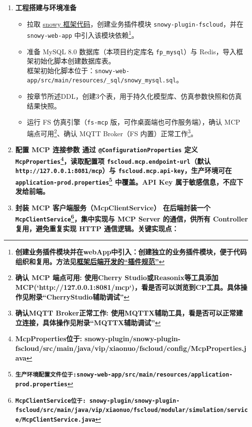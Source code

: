 \begin{enumerate}[label=\arabic*)]
	\item \bf{工程搭建与环境准备}\label{sec:brief-step1}
	\begin{itemize}
		\item 拉取 \href{https://gitee.com/xiaonuobase/snowy}{snowy 框架代码}，创建业务插件模块 \texttt{snowy-plugin-fscloud}，并在 \texttt{snowy-web-app} 中引入该模块依赖\footnote{\bf{创建业务插件模块并在webApp中引入}：创建独立的业务插件模块，便于代码组织和复用。方法见\href{https://xiaonuo.vip/doc?catalogueId=1574674577108783105&menuId=1574678028987420674&lineIndex=1}{框架后端开发的“插件规范”}}。
		\item 准备 MySQL 8.0 数据库（本项目约定库名 \texttt{fp\_mysql}）与 Redis，导入框架初始化脚本创建数据库表。\\框架初始化脚本位于：\texttt{snowy-web-app/src/main/resources/\_sql/snowy\_mysql.sql}。
        \item 按章节所述DDL，创建3个表，用于持久化模型库、仿真参数快照和仿真结果快照。
		\item 运行 FS 仿真引擎（\texttt{fs-mcp} 版，可作桌面端也可作服务端），确认 MCP 端点可用\footnote{\bf{确认 MCP 端点可用}: 使用Cherry Studio或Reasonix等工具添加MCP(`http://127.0.0.1:8081/mcp`)，看是否可以浏览到CP工具。具体操作见附录“CherryStudio辅助调试”}、确认 MQTT Broker（FS 内置）正常工作\footnote{\bf{确认MQTT Broker正常工作}: 使用MQTTX辅助工具，看是否可以正常建立连接，具体操作见附录“MQTTX辅助调试”}。
	\end{itemize}
	\item \bf{配置 MCP 连接参数}
	通过 \texttt{@ConfigurationProperties} 定义 \texttt{McpProperties}\footnote{\bf{McpProperties位于}: snowy-plugin/snowy-plugin-fscloud/src/main/java/vip/xiaonuo/fscloud/config/McpProperties.java}，读取配置项 \texttt{fscloud.mcp.endpoint-url}（默认 \texttt{http://127.0.0.1:8081/mcp}）与 \texttt{fscloud.mcp.api-key}，生产环境可在 \texttt{application-prod.properties\footnote{\bf{生产环境配置文件位于}:snowy-web-app/src/main/resources/application-prod.properties}} 中覆盖。API Key 属于敏感信息，\bf{不应下发给前端}。
	\item \bf{封装 MCP 客户端服务（McpClientService）}\label{sec:brief-step3}
	在后端封装一个 \texttt{McpClientService\footnote{\bf{McpClientService位于}: snowy-plugin/snowy-plugin-fscloud/src/main/java/vip/xiaonuo/fscloud/modular/simulation/service/McpClientService.java}}，集中实现与 MCP Server 的通信，供所有 Controller 复用，避免重复实现 HTTP 通信逻辑。关键实现点：

\end{enumerate}

